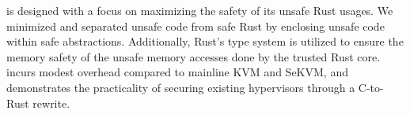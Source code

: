 \begin{abstract*}
\rustsec{} is designed with a focus on maximizing the safety of its unsafe
Rust usages.
We minimized and separated unsafe code from safe Rust by enclosing unsafe code
within safe abstractions.
Additionally, Rust's type system is utilized to ensure the memory safety
of the unsafe memory accesses done by the trusted Rust core.
\rustsec{} incurs modest overhead compared to mainline KVM and SeKVM, and
demonstrates the practicality of securing existing hypervisors through a
C-to-Rust rewrite.

\end{abstract*}
